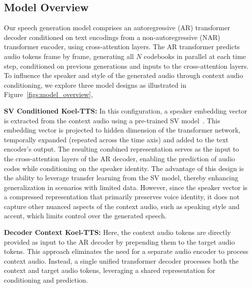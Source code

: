

\subsection{Model Overview}

Our speech generation model comprises an autoregressive (AR) transformer decoder conditioned on text encodings from a non-autoregressive (NAR) transformer encoder, using cross-attention layers. 
The AR transformer predicts audio tokens frame by frame, generating all $N$ codebooks in parallel at each time step, conditioned on previous generations and inputs to the cross-attention layers.
To influence the speaker and style of the generated audio through context audio conditioning, we explore three model designs as illustrated in Figure~\ref{figs:model_overview},

\textbf{SV Conditioned Koel-TTS:} In this configuration, a speaker embedding vector is extracted from the context audio using a pre-trained SV model~\cite{koluguri2022titanetlarge}. This embedding vector is projected to hidden dimension of the transformer network, temporally expanded (repeated across the time axis) and added to the text encoder's output. 
The resulting combined representation serves as the input to the cross-attention layers of the AR decoder, enabling the prediction of audio codes while conditioning on the speaker identity. 
The advantage of this design is the ability to leverage transfer learning from the SV model, thereby enhancing generalization in scenarios with limited data. 
However, since the speaker vector is a compressed representation that primarily preserves voice identity, it does not capture other nuanced aspects of the context audio, such as speaking style and accent, which limits control over the generated speech.

\textbf{Decoder Context Koel-TTS:} Here, the context audio tokens are directly provided as input to the AR decoder by prepending them to the target audio tokens. This approach eliminates the need for a separate audio encoder to process context audio. Instead, a single unified transformer decoder processes both the context and target audio tokens, leveraging a shared representation for conditioning and prediction.

